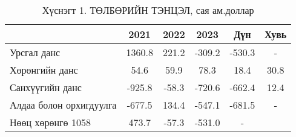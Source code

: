 ﻿\begin{table}[h]
\centering
\caption*{Хүснэгт 1. ТӨЛБӨРИЙН ТЭНЦЭЛ, сая ам.доллар}
\begin{tabular}{l|c|c|c|c|c}
\hline
& \textbf{2021} & \textbf{2022} & \textbf{2023} & \textbf{Дүн} & \textbf{Хувь} \\
\hline
Урсгал данс     & 1360.8 & 221.2 & -309.2 & -530.3 & - \\
Хөрөнгийн данс  & 54.6 & 59.9 & 78.3 & 18.4 & 30.8 \\
Санхүүгийн данс & -925.8 & -58.3 & -720.6 & -662.4 & 12.4 \\
Алдаа болон орхигдуулга & -677.5 & 134.4 & -547.1 & -681.5 & - \\
Нөөц хөрөнгө 1058 & 473.7 & -57.3 & -531.0 & - \\
\hline
\end{tabular}
\label{tab:bop}
\end{table}